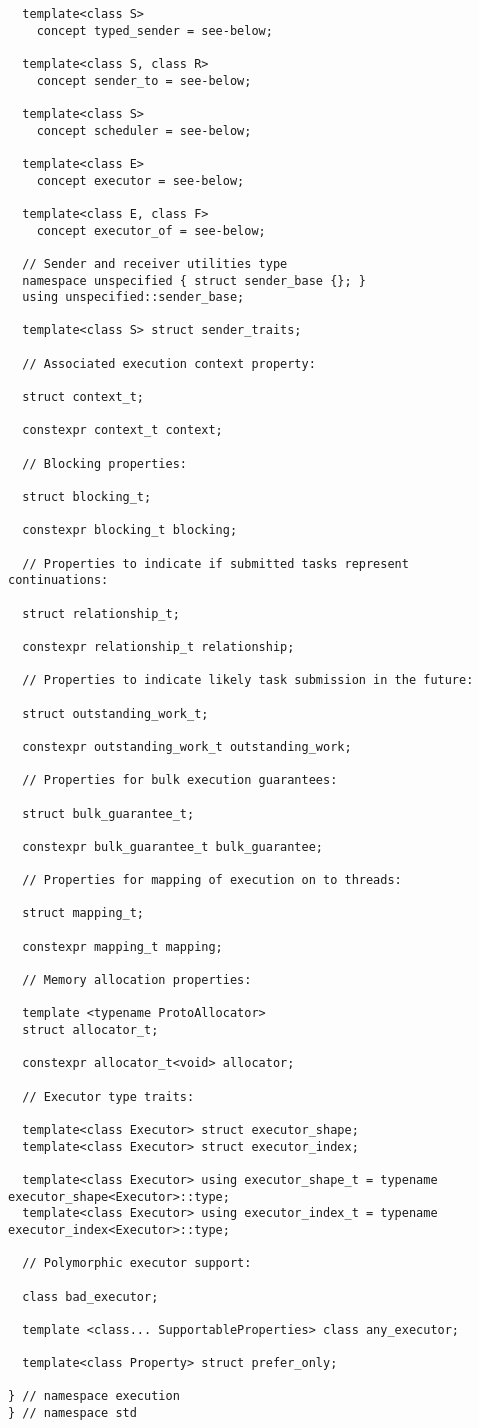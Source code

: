 \documentclass[a4paper,12pt,notitlepage,twoside,openright]{article}
\begin{document}
\begin{verbatim}
  template<class S>
    concept typed_sender = see-below;

  template<class S, class R>
    concept sender_to = see-below;

  template<class S>
    concept scheduler = see-below;

  template<class E>
    concept executor = see-below;

  template<class E, class F>
    concept executor_of = see-below;

  // Sender and receiver utilities type
  namespace unspecified { struct sender_base {}; }
  using unspecified::sender_base;

  template<class S> struct sender_traits;

  // Associated execution context property:

  struct context_t;

  constexpr context_t context;

  // Blocking properties:

  struct blocking_t;

  constexpr blocking_t blocking;

  // Properties to indicate if submitted tasks represent continuations:

  struct relationship_t;

  constexpr relationship_t relationship;

  // Properties to indicate likely task submission in the future:

  struct outstanding_work_t;

  constexpr outstanding_work_t outstanding_work;

  // Properties for bulk execution guarantees:

  struct bulk_guarantee_t;

  constexpr bulk_guarantee_t bulk_guarantee;

  // Properties for mapping of execution on to threads:

  struct mapping_t;

  constexpr mapping_t mapping;

  // Memory allocation properties:

  template <typename ProtoAllocator>
  struct allocator_t;

  constexpr allocator_t<void> allocator;

  // Executor type traits:

  template<class Executor> struct executor_shape;
  template<class Executor> struct executor_index;

  template<class Executor> using executor_shape_t = typename executor_shape<Executor>::type;
  template<class Executor> using executor_index_t = typename executor_index<Executor>::type;

  // Polymorphic executor support:

  class bad_executor;

  template <class... SupportableProperties> class any_executor;

  template<class Property> struct prefer_only;

} // namespace execution
} // namespace std
\end{verbatim}
\end{document}
